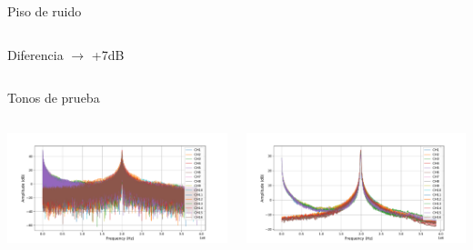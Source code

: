 \documentclass[ignorenonframetext,12pt]{beamer}
\begin{document}
\begin{frame}{Piso de ruido}
\begin{columns}
\begin{column}{0.5\textwidth}{\footnotesize{Diferencia
																$\to$ +7dB}}
												\end{column}
								\end{columns}
				\end{frame}

				\begin{frame}{Tonos de prueba}
								\begin{columns}
												\begin{column}{0.5\textwidth}
																\includegraphics[width=\textwidth]{fdm_out_ch16_2mhz}
												\end{column}
												\begin{column}{0.5\textwidth}
																\includegraphics[width=\textwidth]{ma_fdm_out_ch16_2mhz}
												\end{column}
								\end{columns}
				\end{frame}
\end{document}
